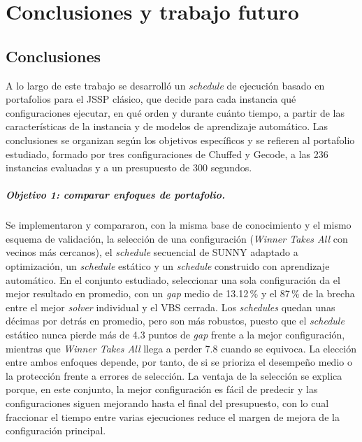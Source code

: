\chapter{Conclusiones y trabajo futuro}
\label{cap:conclusiones}

\section{Conclusiones}
\label{sec:conclusiones}

A lo largo de este trabajo se desarrolló un \textit{schedule} de ejecución
basado en portafolios para el JSSP clásico, que decide para cada instancia qué
configuraciones ejecutar, en qué orden y durante cuánto tiempo, a partir de
las características de la instancia y de modelos de aprendizaje automático.
Las conclusiones se organizan según los objetivos específicos y se refieren
al portafolio estudiado, formado por tres configuraciones de Chuffed y
Gecode, a las 236 instancias evaluadas y a un presupuesto de 300 segundos.

\paragraph{Objetivo 1: comparar enfoques de portafolio.} Se implementaron y
compararon, con la misma base de conocimiento y el mismo esquema de
validación, la selección de una configuración (\textit{Winner Takes All} con
vecinos más cercanos), el \textit{schedule} secuencial de SUNNY adaptado a
optimización, un \textit{schedule} estático y un \textit{schedule} construido
con aprendizaje automático. En el conjunto estudiado, seleccionar una sola
configuración da el mejor resultado en promedio, con un \textit{gap} medio de
13.12\,\% y el 87\,\% de la brecha entre el mejor \textit{solver} individual y
el VBS cerrada. Los \textit{schedules} quedan unas décimas por detrás en
promedio, pero son más robustos, puesto que el \textit{schedule} estático nunca
pierde más de 4.3 puntos de \textit{gap} frente a la mejor configuración,
mientras que \textit{Winner Takes All} llega a perder 7.8 cuando se equivoca. La
elección entre ambos enfoques depende, por tanto, de si se prioriza el
desempeño medio o la protección frente a errores de selección. La ventaja de
la selección se explica porque, en este conjunto, la mejor configuración es
fácil de predecir y las configuraciones siguen mejorando hasta el final del
presupuesto, con lo cual fraccionar el tiempo entre varias ejecuciones reduce el
margen de mejora de la configuración principal.


